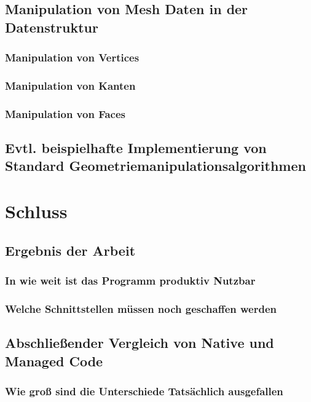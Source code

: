 \documentclass[12pt,a4paper]{scrreprt}
\begin{document}
	\section {Manipulation von Mesh Daten in der Datenstruktur}
		\subsection {Manipulation von Vertices}
		\subsection {Manipulation von Kanten}
		\subsection {Manipulation von Faces}
	\section {Evtl. beispielhafte Implementierung von Standard Geometriemanipulationsalgorithmen}





\chapter {Schluss}
	\section {Ergebnis der Arbeit}
		\subsection {In wie weit ist das Programm produktiv Nutzbar}
		\subsection {Welche Schnittstellen müssen noch geschaffen werden}
	\section {Abschließender Vergleich von Native und Managed Code}
		\subsection {Wie groß sind die Unterschiede Tatsächlich ausgefallen}
\end{document}
